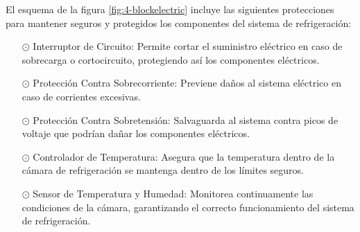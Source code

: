 El esquema de la figura \ref{fig:4-blockelectric} incluye las siguientes protecciones para mantener seguros y protegidos los componentes del sistema de refrigeración:
\begin{itemize}

	\item[$\odot$] Interruptor de Circuito: Permite cortar el suministro eléctrico en caso de sobrecarga o cortocircuito, protegiendo así los componentes eléctricos.

	\item[$\odot$] Protección Contra Sobrecorriente: Previene daños al sistema eléctrico en caso de corrientes excesivas.

\item[$\odot$] Protección Contra Sobretensión: Salvaguarda al sistema contra picos de voltaje que podrían dañar los componentes eléctricos.

\item[$\odot$] Controlador de Temperatura: Asegura que la temperatura dentro de la cámara de refrigeración se mantenga dentro de los límites seguros.

\item[$\odot$] Sensor de Temperatura y Humedad: Monitorea continuamente las condiciones de la cámara, garantizando el correcto funcionamiento del sistema de refrigeración.

\end{itemize}
